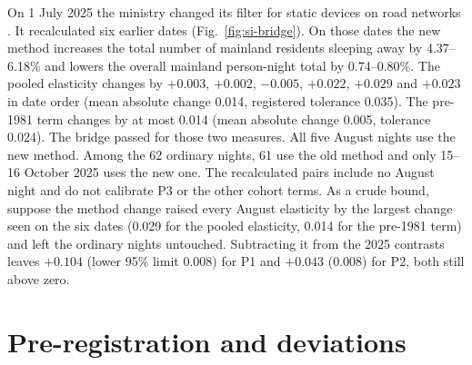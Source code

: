 \documentclass[pdflatex,sn-mathphys-num]{sn-jnl}
\begin{document}
On 1 July 2025 the ministry changed its filter for static devices on road networks \cite{mitms2025methodchange}. It recalculated six earlier dates (Fig.~\ref{fig:si-bridge}). On those dates the new method increases the total number of mainland residents sleeping away by 4.37--6.18\% and lowers the overall mainland person-night total by 0.74--0.80\%. The pooled elasticity changes by $+0.003$, $+0.002$, $-0.005$, $+0.022$, $+0.029$ and $+0.023$ in date order (mean absolute change 0.014, registered tolerance 0.035). The pre-1981 term changes by at most 0.014 (mean absolute change 0.005, tolerance 0.024). The bridge passed for those two measures. All five August nights use the new method. Among the 62 ordinary nights, 61 use the old method and only 15--16 October 2025 uses the new one. The recalculated pairs include no August night and do not calibrate P3 or the other cohort terms. As a crude bound, suppose the method change raised every August elasticity by the largest change seen on the six dates (0.029 for the pooled elasticity, 0.014 for the pre-1981 term) and left the ordinary nights untouched. Subtracting it from the 2025 contrasts leaves $+0.104$ (lower 95\% limit 0.008) for P1 and $+0.043$ (0.008) for P2, both still above zero.

\FloatBarrier
\section{Pre-registration and deviations}\label{si:prereg}
\end{document}
